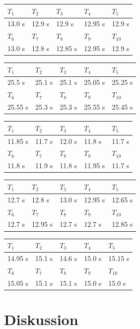 \documentclass[12pt,a4paper]{article}
\begin{document}
\begin{tabular}{|l|l|l|l|l|}
\hline
$T_{1}$&$T_{2}$&$T_{3}$&$T_{4}$&$T_{5}$\\
\hline
13.0 s&12.9 s&12.9 s&12.95 s&12.9 s\\
\hline
\hline
$T_{6}$&$T_{7}$&$T_{8}$&$T_{9}$&$T_{10}$\\
\hline
13.0 s&12.8 s&12.85 s&12.95 s&12.9 s\\
\hline
\end{tabular}

\begin{tabular}{|l|l|l|l|l|}
\hline
$T_{1}$&$T_{2}$&$T_{3}$&$T_{4}$&$T_{5}$\\
\hline
25.5 s&25.1 s&25.1 s&25.05 s&25.25 s\\
\hline
\hline
$T_{6}$&$T_{7}$&$T_{8}$&$T_{9}$&$T_{10}$\\
\hline
25.55 s&25.3 s&25.3 s&25.55 s&25.45 s\\
\hline
\end{tabular}

\begin{tabular}{|l|l|l|l|l|}
\hline
$T_{1}$&$T_{2}$&$T_{3}$&$T_{4}$&$T_{5}$\\
\hline
11.85 s&11.7 s&12.0 s&11.8 s&11.7 s\\
\hline
\hline
$T_{6}$&$T_{7}$&$T_{8}$&$T_{9}$&$T_{10}$\\
\hline
11.8 s&11.9 s&11.8 s&11.95 s&11.7 s\\
\hline
\end{tabular}

\begin{tabular}{|l|l|l|l|l|}
\hline
$T_{1}$&$T_{2}$&$T_{3}$&$T_{4}$&$T_{5}$\\
\hline
12.7 s&12.8 s&13.0 s&12.95 s&12.65 s\\
\hline
\hline
$T_{6}$&$T_{7}$&$T_{8}$&$T_{9}$&$T_{10}$\\
\hline
12.7 s&12.95 s&12.7 s&12.7 s&12.85 s\\
\hline
\end{tabular}

\begin{tabular}{|l|l|l|l|l|}
\hline
$T_{1}$&$T_{2}$&$T_{3}$&$T_{4}$&$T_{5}$\\
\hline
14.95 s&15.1 s&14.6 s&15.0 s&15.15 s\\
\hline
\hline
$T_{6}$&$T_{7}$&$T_{8}$&$T_{9}$&$T_{10}$\\
\hline
15.05 s&15.1 s&15.1 s&15.0 s&15.0 s\\
\hline
\end{tabular}

\section*{Diskussion}
\end{document}
